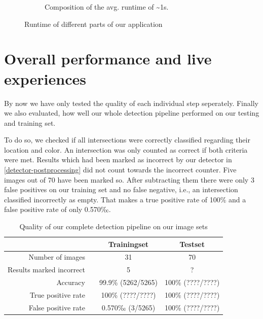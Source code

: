 \begin{figure}
\begin{subfigure}{0.25\textwidth}
\begin{tikzpicture}
			\end{tikzpicture}
			\vspace{1.5em}
			\caption{Composition of the avg. runtime of \textasciitilde1s.}
			\label{fig:timeEvaluation-pie}
		\end{subfigure}

		\caption{Runtime of different parts of our application}
		\label{fig:timeEvaluation}
	\end{figure}




	\section{Overall performance and live experiences}
	\label{evaluation-overallPerformance}
	By now we have only tested the quality of each individual step seperately. Finally we also evaluated, how well our whole detection pipeline performed on our testing and training set.

	To do so, we checked if all intersections were correctly classified regarding their location and color. An intersection was only counted as correct if both criteria were met. Results which had been marked as incorrect by our detector in \autoref{detector-postprocessing} did not count towards the incorrect counter. Five images out of 70  have been marked so. After subtracting them there were only 3 false positives on our training set and no false negative, i.e., an intersection classified incorrectly as empty.  That makes a true positive rate of 100\% and a false positive rate of only 0.570‰.

	\begin{table}
	\center
		\begin{tabular}{rlcc}
			  &\hphantom{Abst}	 & 			Trainingset	& Testset \\
			\toprule
			Number of images	&&					31 	& 70		  \\
			Results marked incorrect &&				 5 	& ?	\\
			Accuracy 			&&	99.9\% (5262/5265)	& 100\% (????/????) \\
			True positive rate	&&	100\% (????/????)	& 100\% (????/????) \\
			False positive rate &&	0.570‰ (3/5265)		& 100\% (????/????) \\
			\bottomrule

		\end{tabular}
		\caption{Quality of our complete detection pipeline on our image sets}
	\end{table}


